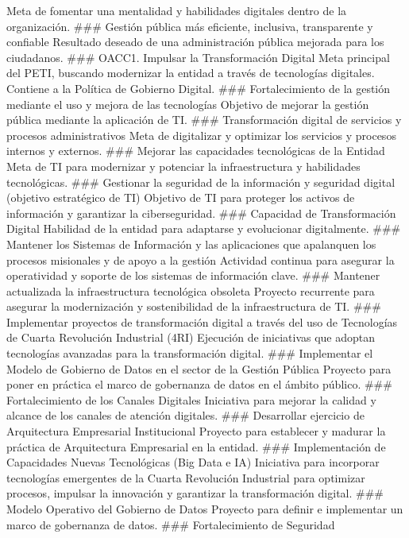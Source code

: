 \documentclass[
	a4paper, %
	12pt, %
]{include/CSSullivanBusinessReport}
\begin{document}
Meta de fomentar una mentalidad y habilidades digitales dentro de la
organización. \#\#\# Gestión pública más eficiente, inclusiva,
transparente y confiable Resultado deseado de una administración pública
mejorada para los ciudadanos. \#\#\# OACC1. Impulsar la Transformación
Digital Meta principal del PETI, buscando modernizar la entidad a través
de tecnologías digitales. Contiene a la Política de Gobierno Digital.
\#\#\# Fortalecimiento de la gestión mediante el uso y mejora de las
tecnologías Objetivo de mejorar la gestión pública mediante la
aplicación de TI. \#\#\# Transformación digital de servicios y procesos
administrativos Meta de digitalizar y optimizar los servicios y procesos
internos y externos. \#\#\# Mejorar las capacidades tecnológicas de la
Entidad Meta de TI para modernizar y potenciar la infraestructura y
habilidades tecnológicas. \#\#\# Gestionar la seguridad de la
información y seguridad digital (objetivo estratégico de TI) Objetivo de
TI para proteger los activos de información y garantizar la
ciberseguridad. \#\#\# Capacidad de Transformación Digital Habilidad de
la entidad para adaptarse y evolucionar digitalmente. \#\#\# Mantener
los Sistemas de Información y las aplicaciones que apalanquen los
procesos misionales y de apoyo a la gestión Actividad continua para
asegurar la operatividad y soporte de los sistemas de información clave.
\#\#\# Mantener actualizada la infraestructura tecnológica obsoleta
Proyecto recurrente para asegurar la modernización y sostenibilidad de
la infraestructura de TI. \#\#\# Implementar proyectos de transformación
digital a través del uso de Tecnologías de Cuarta Revolución Industrial
(4RI) Ejecución de iniciativas que adoptan tecnologías avanzadas para la
transformación digital. \#\#\# Implementar el Modelo de Gobierno de
Datos en el sector de la Gestión Pública Proyecto para poner en práctica
el marco de gobernanza de datos en el ámbito público. \#\#\#
Fortalecimiento de los Canales Digitales Iniciativa para mejorar la
calidad y alcance de los canales de atención digitales. \#\#\#
Desarrollar ejercicio de Arquitectura Empresarial Institucional Proyecto
para establecer y madurar la práctica de Arquitectura Empresarial en la
entidad. \#\#\# Implementación de Capacidades Nuevas Tecnológicas (Big
Data e IA) Iniciativa para incorporar tecnologías emergentes de la
Cuarta Revolución Industrial para optimizar procesos, impulsar la
innovación y garantizar la transformación digital. \#\#\# Modelo
Operativo del Gobierno de Datos Proyecto para definir e implementar un
marco de gobernanza de datos. \#\#\# Fortalecimiento de Seguridad
\end{document}
